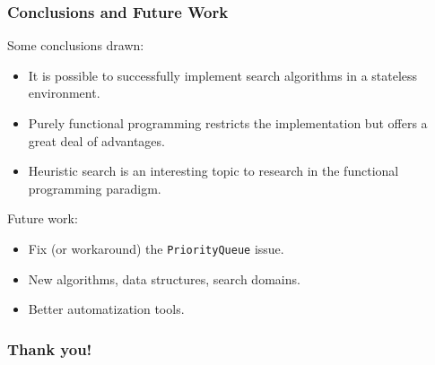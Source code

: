 \documentclass{beamer}
\begin{document}
\begin{frame}
  \frametitle{Conclusions and Future Work}
  Some conclusions drawn:
  \begin{itemize}
  \item It is possible to successfully implement search algorithms in a
    stateless environment.
  \item Purely functional programming restricts the implementation but offers a
    great deal of advantages.
  \item Heuristic search is an interesting topic to research in the functional
    programming paradigm.
  \end{itemize}

  Future work:
  \begin{itemize}
  \item Fix (or workaround) the \texttt{PriorityQueue} issue.
  \item New algorithms, data structures, search domains.
  \item Better automatization tools.
  \end{itemize}
\end{frame}

\begin{frame}
  \frametitle{Thank you!}
\end{frame}
\end{document}

